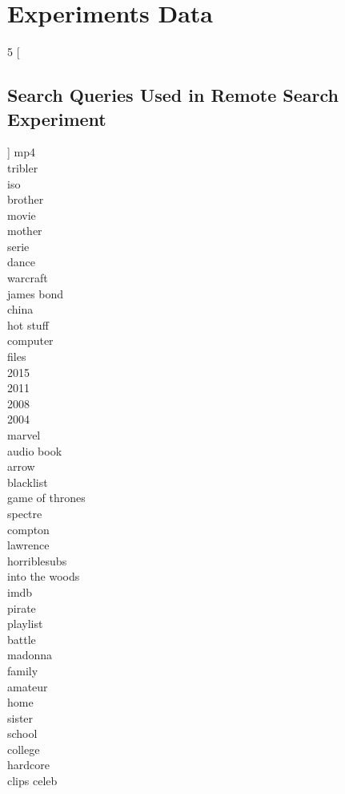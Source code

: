 \chapter{Experiments Data}

\begin{multicols}{5}
	[
	\section{Search Queries Used in Remote Search Experiment}
	\label{appsec:search-remote}
	]
	mp4\\
	tribler\\
	iso\\
	brother\\
	movie\\
	mother\\
	serie\\
	dance\\
	warcraft\\
	james bond\\
	china\\
	hot stuff\\
	computer\\
	files\\
	2015\\
	2011\\
	2008\\
	2004\\
	marvel\\
	audio book\\
	arrow\\
	blacklist\\
	game of thrones\\
	spectre\\
	compton\\
	lawrence\\
	horriblesubs\\
	into the woods\\
	imdb\\
	pirate\\
	playlist\\
	battle\\
	madonna\\
	family\\
	amateur\\
	home\\
	sister\\
	school\\
	college\\
	hardcore\\
	clips celeb\\

\end{multicols}
